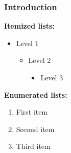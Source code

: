 \documentclass[
    11pt,
    t,
    usepdftitle=false,
    aspectratio=169,
]{beamer}
\renewcommand{\*}{\mathrm}
\begin{document}
\begin{frame}
\frametitle{Introduction}
   \textbf{Itemized lists:}
   \begin{itemize}
      \item Level 1
      \begin{itemize}
         \item Level 2
         \begin{itemize}
            \item Level 3
         \end{itemize}
      \end{itemize}
   \end{itemize}

\bigskip

   \textbf{Enumerated lists:}
   \begin{enumerate}
      \item First item
      \item Second item
      \item Third item
   \end{enumerate}

\end{frame}
%
\end{document}
